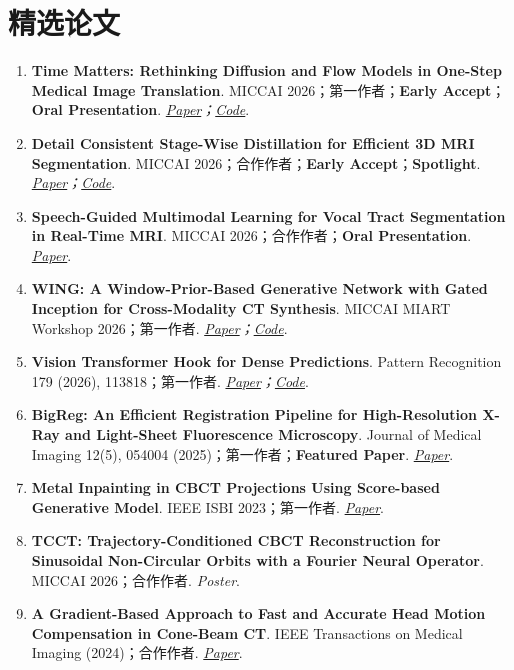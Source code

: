 \documentclass[10pt,a4paper]{article}
\newcommand{\zhpub}[3]{\item \textbf{#1}. #2. \textit{#3}.}
\newcommand{\zhlabel}[1]{\textcolor{highlightred}{\textbf{#1}}}
\begin{document}
\section{精选论文}
\begin{enumerate}
    \zhpub{Time Matters: Rethinking Diffusion and Flow Models in One-Step Medical Image Translation}{MICCAI 2026；第一作者；\zhlabel{Early Accept}；\zhlabel{Oral Presentation}}{\href{https://github.com/siyuan-mei/JiR\#citation}{Paper}；\href{https://github.com/siyuan-mei/JiR}{Code}}
    \zhpub{Detail Consistent Stage-Wise Distillation for Efficient 3D MRI Segmentation}{MICCAI 2026；合作作者；\zhlabel{Early Accept}；\zhlabel{Spotlight}}{\href{https://arxiv.org/abs/2605.26382}{Paper}；\href{https://github.com/ClinicaAlpha/DCD-3D-MedSeg}{Code}}
    \zhpub{Speech-Guided Multimodal Learning for Vocal Tract Segmentation in Real-Time MRI}{MICCAI 2026；合作作者；\zhlabel{Oral Presentation}}{\href{https://arxiv.org/abs/2605.18466}{Paper}}
    \zhpub{WING: A Window-Prior-Based Generative Network with Gated Inception for Cross-Modality CT Synthesis}{MICCAI MIART Workshop 2026；第一作者}{\href{https://arxiv.org/abs/2607.06234}{Paper}；\href{https://github.com/siyuan-mei/WING}{Code}}
    \zhpub{Vision Transformer Hook for Dense Predictions}{Pattern Recognition 179 (2026), 113818；第一作者}{\href{https://doi.org/10.1016/j.patcog.2026.113818}{Paper}；\href{https://github.com/siyuan-mei/ViT-Hook}{Code}}
    \zhpub{BigReg: An Efficient Registration Pipeline for High-Resolution X-Ray and Light-Sheet Fluorescence Microscopy}{Journal of Medical Imaging 12(5), 054004 (2025)；第一作者；\zhlabel{Featured Paper}}{\href{https://doi.org/10.1117/1.JMI.12.5.054004}{Paper}}
    \zhpub{Metal Inpainting in CBCT Projections Using Score-based Generative Model}{IEEE ISBI 2023；第一作者}{\href{https://doi.org/10.1109/ISBI53787.2023.10230638}{Paper}}
    \zhpub{TCCT: Trajectory-Conditioned CBCT Reconstruction for Sinusoidal Non-Circular Orbits with a Fourier Neural Operator}{MICCAI 2026；合作作者}{Poster}
    \zhpub{A Gradient-Based Approach to Fast and Accurate Head Motion Compensation in Cone-Beam CT}{IEEE Transactions on Medical Imaging (2024)；合作作者}{\href{https://doi.org/10.1109/TMI.2024.3474250}{Paper}}
\end{enumerate}
\end{document}

